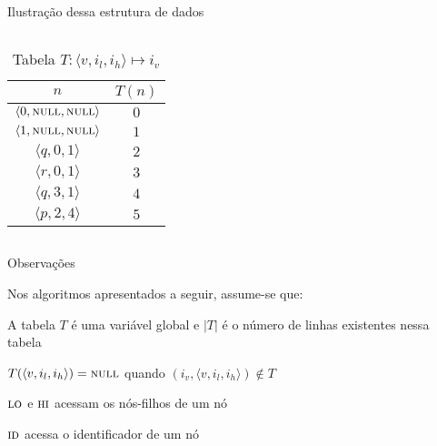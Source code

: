 \expandafter\documentclass\expandafter[table, usenames, svgnames, dvipsnames,14pt, \classopts]{beamer}
\begin{document}
\begin{frame}{Ilustração dessa estrutura de dados}
\begin{columns}[c]
        
            \renewcommand{\arraystretch}{1.5}        
            \begin{table}
                \scriptsize
                \caption{Tabela $T: \langle v,i_l,i_h \rangle \mapsto i_v$}
                \begin{tabular}{c|c}
                    $n$ & $T(n)$\\
                    \hline
                    $\langle 0,\textproc{null},\textproc{null} \rangle$ & $0$\\
                    $\langle 1,\textproc{null},\textproc{null} \rangle$ & $1$\\
                    $\langle q,0,1 \rangle$                             & $2$\\
                    $\langle r,0,1 \rangle$                             & $3$\\
                    $\langle q,3,1 \rangle$                             & $4$\\
                    $\langle p,2,4 \rangle$                             & $5$\\
                \end{tabular}
            \end{table}
            
    \end{columns}
    
\end{frame}

\begin{frame}{Observações}

    Nos algoritmos apresentados a seguir, assume-se que:

    \begin{outline}
        \small
        \1 A tabela $T$ é uma variável global e $|T|$ é o número de linhas existentes nessa tabela

        \1 $T(\langle v,i_l,i_h \rangle) = \textproc{null}$ quando $(i_v, \langle v,i_l,i_h \rangle) \notin T$
        
        \1 $\textproc{lo}$ e $\textproc{hi}$ acessam os nós-filhos de um nó

        \1 $\textproc{id}$ acessa o identificador de um nó
            
    \end{outline}
    
\end{frame}
\end{document}
